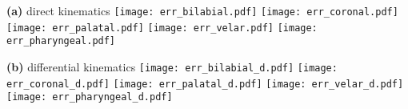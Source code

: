 \documentclass[varwidth=7in]{standalone}
\begin{document}
\raggedright

{\bf (a)} direct kinematics
\texttt{[image: err\_bilabial.pdf]}%
\texttt{[image: err\_coronal.pdf]}%
\texttt{[image: err\_palatal.pdf]}%
\texttt{[image: err\_velar.pdf]}%
\texttt{[image: err\_pharyngeal.pdf]}

{\bf (b)} differential kinematics
\texttt{[image: err\_bilabial\_d.pdf]}%
\texttt{[image: err\_coronal\_d.pdf]}%
\texttt{[image: err\_palatal\_d.pdf]}%
\texttt{[image: err\_velar\_d.pdf]}%
\texttt{[image: err\_pharyngeal\_d.pdf]}
\end{document}
